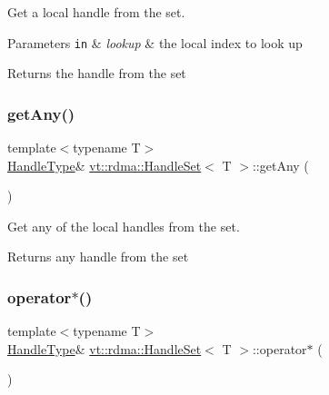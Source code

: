 Get a local handle from the set. 


\begin{DoxyParams}[1]{Parameters}
\mbox{\tt in}  & {\em lookup} & the local index to look up\\
\hline
\end{DoxyParams}
\begin{DoxyReturn}{Returns}
the handle from the set 
\end{DoxyReturn}
\mbox{\label{structvt_1_1rdma_1_1_handle_set_a9b83c1e278ad60647007350339443643}} 
\subsubsection{\texorpdfstring{get\+Any()}{getAny()}}
{\footnotesize\ttfamily template$<$typename T$>$ \\
\hyperlink{structvt_1_1rdma_1_1_handle_set_ab3a698ee86bae503dfa84617205b2dd9}{Handle\+Type}\& \hyperlink{structvt_1_1rdma_1_1_handle_set}{vt\+::rdma\+::\+Handle\+Set}$<$ T $>$\+::get\+Any (\begin{DoxyParamCaption}{ }\end{DoxyParamCaption})\hspace{0.3cm}{\ttfamily [inline]}}



Get any of the local handles from the set. 

\begin{DoxyReturn}{Returns}
any handle from the set 
\end{DoxyReturn}
\mbox{\label{structvt_1_1rdma_1_1_handle_set_a9ad10a3906540909c0344bbf84789fba}} 
\subsubsection{\texorpdfstring{operator$\ast$()}{operator*()}}
{\footnotesize\ttfamily template$<$typename T$>$ \\
\hyperlink{structvt_1_1rdma_1_1_handle_set_ab3a698ee86bae503dfa84617205b2dd9}{Handle\+Type}\& \hyperlink{structvt_1_1rdma_1_1_handle_set}{vt\+::rdma\+::\+Handle\+Set}$<$ T $>$\+::operator$\ast$ (\begin{DoxyParamCaption}{ }\end{DoxyParamCaption})\hspace{0.3cm}{\ttfamily [inline]}}



